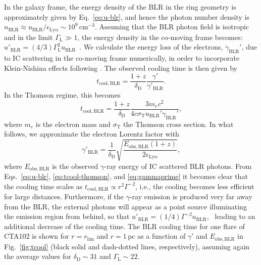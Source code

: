 \documentclass[twocolumn,linenumbers]{aastex62}
\newcommand{\gray}{$\gamma$-ray\xspace}
\begin{document}
In the galaxy frame, the energy density of the BLR in the ring geometry is approximately given by Eq.~\ref{eq:u-blr}, and hence the photon number density is $n_\mathrm{BLR} \approx u_\mathrm{BLR} / \epsilon_{\mathrm{Ly}\alpha}\sim10^{9}\,\mathrm{cm}^{-3}$.
Assuming that the BLR photon field is isotropic and in the limit $\Gamma_\mathrm{L} \gg 1$, the energy density in the co-moving frame becomes:
$u'_\mathrm{BLR} = (4/3)\Gamma_\mathrm{L}^2 u_\mathrm{BLR}$~\citep{1994ApJS...90..945D,2002ApJ...575..667D}.
We calculate the energy loss of the electrons, $\dot{\gamma}_\mathrm{BLR}'$, due to IC scattering in the co-moving frame numerically, in order to incorporate Klein-Nishina   effects following \citet{1970RvMP...42..237B}.
The observed cooling time is then given by
\begin{equation}
    t_\mathrm{cool,BLR} = \frac{1 + z}{\delta_\mathrm{D}} \frac{\gamma'}{\dot{\gamma}'_\mathrm{BLR}}.
    \label{eq:tcool}
\end{equation}
In the Thomson regime, this becomes
\begin{equation}
    t_\mathrm{cool,BLR} = \frac{1+z}{\delta_\mathrm{D}}\frac{3m_ec^2}{4c\sigma_\mathrm{T}u_\mathrm{BLR}'\gamma_\mathrm{BLR}'},
    \label{eq:tcool-thomson}
\end{equation}
where $m_e$ is the electron mass and $\sigma_\mathrm{T}$ the Thomson cross section. 
In what follows, we approximate the electron Lorentz factor with~\citep[e.g.,][]{2009herb.book.....D,finke2016}
\begin{equation}
    \gamma'_\mathrm{BLR} = \frac{1}{ \delta_\mathrm{D}}\sqrt{\frac{E_\mathrm{obs,BLR}(1+z)}{2\epsilon_{\mathrm{Ly}\alpha}}},
    \label{eq:gammaprime}
\end{equation}
where $E_\mathrm{obs,BLR}$ is the observed \gray energy of IC scattered BLR photons. 
From Eqs.~\ref{eq:u-blr}, \ref{eq:tcool-thomson}, and \ref{eq:gammaprime} it becomes clear that the cooling time scales as $t_\mathrm{cool, BLR}\propto r^2 \Gamma^{-2}$, i.e., the cooling becomes less efficient for large distances. 
Furthermore, if the \gray emission is produced very far away from the BLR, the external photons will appear as a point source illuminating the emission region from behind, so that $u'_\mathrm{BLR} = (1/4)\Gamma^{-2} u_\mathrm{BLR}$,~\citep{1994ApJS...90..945D} leading to an additional decrease of the cooling time. 
The BLR cooling time for one flare of CTA102 is shown for $r=r_\mathrm{lim}$ and $r = 1\,$pc as a function of $\gamma'$ and $E_\mathrm{obs,BLR}$ in Fig.~\ref{fig:tcool}  (black solid and dash-dotted lines, respectively), assuming again the average values for $\delta_\mathrm{D}\sim31$ and $\Gamma_\mathrm{L}\sim22$. 
\end{document}
